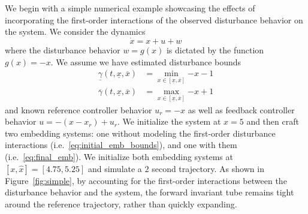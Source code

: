 \documentclass[preprint,12pt]{elsarticle}
\newcommand{\ul}{\underline}
\newcommand{\ol}{\overline}
\begin{document}
We begin with a simple numerical example showcasing the effects of incorporating the first-order interactions of the observed disturbance behavior on the system. We consider the dynamics
\begin{equation}
    \dot{x} = x + u + w
\end{equation}
where the disturbance behavior $w = g(x)$ is dictated by the function $g(x) = -x$. We assume we have estimated disturbance bounds
\begin{align}
    \ul{\gamma}(t, \ul{x}, \ol{x}) &= \min_{x\in[\ul{x}, \ol{x}]}{-x - 1} \\
    \ol{\gamma}(t, \ul{x}, \ol{x}) &= \max_{x\in[\ul{x}, \ol{x}]}{-x + 1}
\end{align}
and known reference controller behavior $u_r = -x$ as well as feedback controller behavior $u = -(x - x_r) + u_r$. We initialize the system at $x = 5$ and then craft two embedding systems: one without modeling the first-order disturbance interactions (i.e.~\eqref{eq:initial_emb_bounds}), and one with them (i.e.~\eqref{eq:final_emb}). We initialize both embedding systems at $[x, \widehat{x}] = [4.75, 5.25]$ and simulate a $2$ second trajectory. As shown in Figure~\ref{fig:simple}, by accounting for the first-order interactions between the disturbance behavior and the system, the forward invariant tube remains tight around the reference trajectory, rather than quickly expanding.
\end{document}
